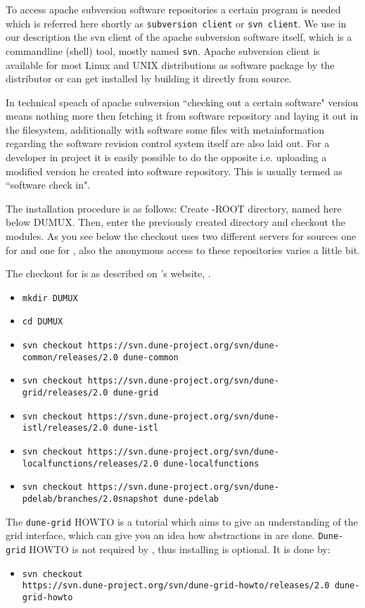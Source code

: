 To access apache subversion software repositories a certain program is needed which is referred here shortly as \texttt{subversion client} or \texttt{svn client}. We use in our description the svn client of the apache subversion software itself, which is a commandline (shell) tool, mostly named \texttt{svn}. 
Apache subversion client is available for most Linux and UNIX distributions as software package by the distributor or can get installed by building it directly from source.

In technical speach of apache subversion ``checking out a certain software" version means nothing more then fetching 
it from software repository and laying it out in the filesystem, additionally with software some files with metainformation regarding the software revision control system itself are also laid out.
For a developer in \Dumux project it is easily possible to do the opposite i.e. uploading a modified version he created into software repository. This is usually termed as ``software check in".

The installation procedure is as follows:
Create {\Dune}-ROOT directory, named here below DUMUX.
Then, enter the previously created directory and checkout the modules. 
As you see below the checkout uses two different servers for sources one for \Dune and one for \Dumux, also the 
anonymous access to these repositories varies a little bit. 

The checkout for \Dune is as described on \Dune's website, \cite{DUNE-HP}.
\begin{itemize}
\item \texttt{mkdir DUMUX}
\item \texttt{cd DUMUX}
\item \texttt{svn checkout https://svn.dune-project.org/svn/dune-common/releases/2.0 dune-common}
\item \texttt{svn checkout https://svn.dune-project.org/svn/dune-grid/releases/2.0 dune-grid}
\item \texttt{svn checkout https://svn.dune-project.org/svn/dune-istl/releases/2.0 dune-istl}
\item \texttt{svn checkout https://svn.dune-project.org/svn/dune-localfunctions/releases/2.0 dune-localfunctions}
\item \texttt{svn checkout https://svn.dune-project.org/svn/dune-pdelab/branches/2.0snapshot dune-pdelab}
\end{itemize} 

The \texttt{dune-grid} HOWTO is a tutorial which aims to give an understanding of the \Dune grid interface, which can 
give you an idea how abstractions in \Dune are done. \texttt{Dune-grid} HOWTO is not required by \Dumux, thus installing is optional. It is done by: 
\begin{itemize}
\item \texttt{svn checkout \\
      \hspace{4cm} https://svn.dune-project.org/svn/dune-grid-howto/releases/2.0 dune-grid-howto}
\end{itemize}

